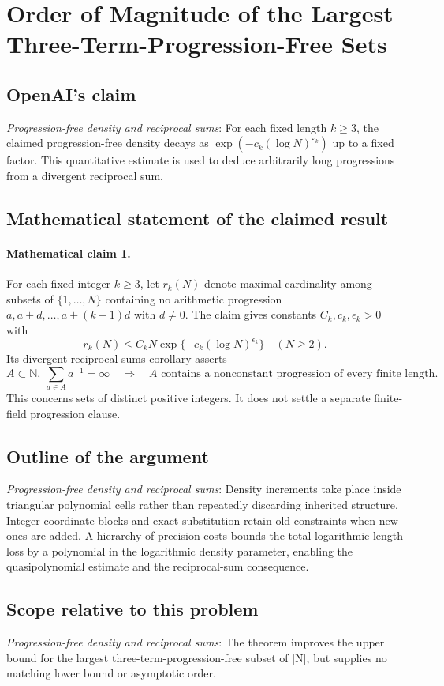 \documentclass[11pt]{article}
\begin{document}
\section*{Order of Magnitude of the Largest Three-Term-Progression-Free Sets}

\subsection{OpenAI's claim}
\textit{Progression-free density and reciprocal sums}: For each fixed length $k\ge3$, the claimed progression-free density decays as $\exp(-c_k(\log N)^{\varepsilon_k})$ up to a fixed factor. This quantitative estimate is used to deduce arbitrarily long progressions from a divergent reciprocal sum.

\subsection{Mathematical statement of the claimed result}
\paragraph{Mathematical claim 1.} For each fixed integer $k\ge3$, let $r_k(N)$ denote maximal cardinality among subsets of $\{1,\ldots,N\}$ containing no arithmetic progression $a,a+d,\ldots,a+(k-1)d$ with $d\ne0$. The claim gives constants $C_k,c_k,\epsilon_k>0$ with \[r_k(N)\le C_kN\exp\{-c_k(\log N)^{\epsilon_k}\}\quad(N\ge2).\] Its divergent-reciprocal-sums corollary asserts \[A\subset\mathbb N,\ \sum_{a\in A}a^{-1}=\infty\quad\Longrightarrow\quad A\text{ contains a nonconstant progression of every finite length}.\] This concerns sets of distinct positive integers. It does not settle a separate finite-field progression clause.

\subsection{Outline of the argument}
\textit{Progression-free density and reciprocal sums}: Density increments take place inside triangular polynomial cells rather than repeatedly discarding inherited structure. Integer coordinate blocks and exact substitution retain old constraints when new ones are added. A hierarchy of precision costs bounds the total logarithmic length loss by a polynomial in the logarithmic density parameter, enabling the quasipolynomial estimate and the reciprocal-sum consequence.

\subsection{Scope relative to this problem}
\textit{Progression-free density and reciprocal sums}: The theorem improves the upper bound for the largest three-term-progression-free subset of [N], but supplies no matching lower bound or asymptotic order.
\end{document}
